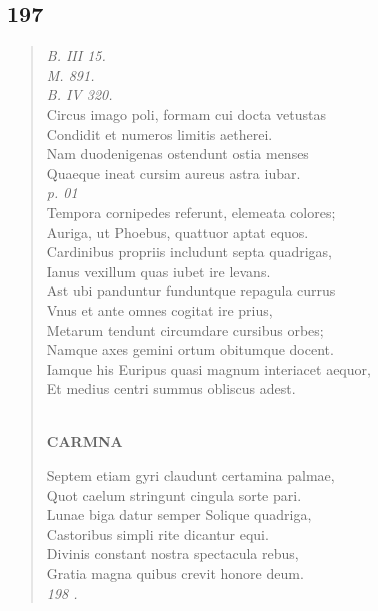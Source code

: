 \documentclass[11pt, a4paper]{report}
\begin{document}
            \subsection*{197}
      \begin{verse}
      \textit{B. III 15.} \\ \textit{M. 891.} \\ \textit{B. IV 320.} \\ Circus imago poli, formam cui docta vetustas \\ Condidit et numeros limitis aetherei. \\ Nam duodenigenas ostendunt ostia menses \\ Quaeque ineat cursim aureus astra iubar. \\ \textit{p. 01} \\ Tempora cornipedes referunt, elemeata colores; \\ Auriga, ut Phoebus, quattuor aptat equos. \\ Cardinibus propriis includunt septa quadrigas, \\ Ianus vexillum quas iubet ire levans. \\ Ast ubi panduntur funduntque repagula currus \\ Vnus et ante omnes cogitat ire prius, \\ Metarum tendunt circumdare cursibus orbes; \\ Namque axes gemini ortum obitumque docent. \\ Iamque his Euripus quasi magnum interiacet aequor, \\ Et medius centri summus obliscus adest. \\ 
        ﻿\pagebreak 
     \marginpar{[162]} \begin{center} \textbf{CARMNA} \end{center}Septem etiam gyri claudunt certamina palmae, \\ Quot caelum stringunt cingula sorte pari. \\ Lunae biga datur semper Solique quadriga, \\ Castoribus simpli rite dicantur equi. \\ Divinis constant nostra spectacula rebus, \\ Gratia magna quibus crevit honore deum. \\ \textit{198 .} \\ 
      \end{verse}
  
\end{document}
